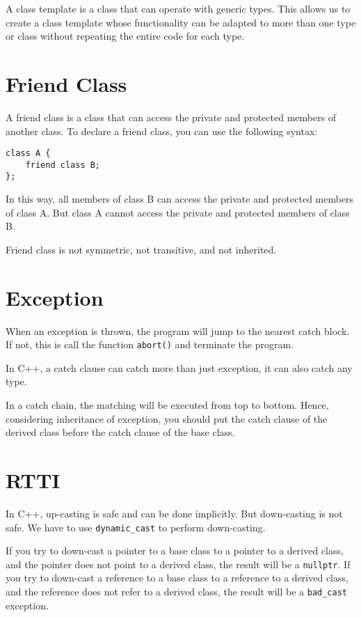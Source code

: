 \documentclass[a4paper,12pt]{article}
\begin{document}
A class template is a class that can operate with generic types.
This allows us to create a class template whose functionality can be adapted to more than one type or class without repeating the entire code for each type.

\section{Friend Class}

A friend class is a class that can access the private and protected members of another class.
To declare a friend class, you can use the following syntax:
\begin{verbatim}
class A {
    friend class B;
};
\end{verbatim}

In this way, all members of class B can access the private and protected members of class A.
But class A cannot access the private and protected members of class B.

Friend class is not symmetric, not transitive, and not inherited.

\section{Exception}

When an exception is thrown, the program will jump to the nearest catch block.
If not, this is call the function \texttt{abort()} and terminate the program.

In C++, a catch clause can catch more than just exception, it can also catch any type.

In a catch chain, the matching will be executed from top to bottom.
Hence, considering inheritance of exception, you should put the catch clause of the derived class before the catch clause of the base class.

\section{RTTI}

In C++, up-casting is safe and can be done implicitly.
But down-casting is not safe.
We have to use \texttt{dynamic\_cast} to perform down-casting.

If you try to down-cast a pointer to a base class to a pointer to a derived class, and the pointer does not point to a derived class, the result will be a \texttt{nullptr}.
If you try to down-cast a reference to a base class to a reference to a derived class, and the reference does not refer to a derived class, the result will be a \texttt{bad\_cast} exception.
\end{document}
